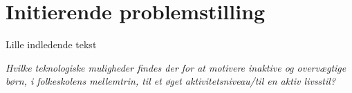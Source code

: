 \section{Initierende problemstilling}
Lille indledende tekst

\textit{Hvilke teknologiske muligheder findes der for at motivere inaktive og overvægtige børn, i folkeskolens mellemtrin, til et øget aktivitetsniveau/til en aktiv livsstil?}